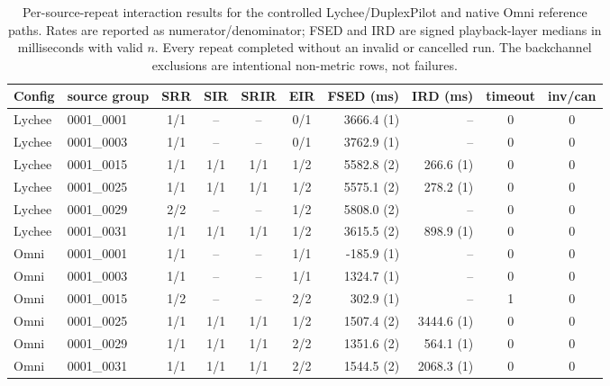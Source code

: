 \begin{table}[t]
\centering
\scriptsize
\setlength{\tabcolsep}{3pt}
\caption{Per-source-repeat interaction results for the controlled Lychee/DuplexPilot and native Omni reference paths. Rates are reported as numerator/denominator; FSED and IRD are signed playback-layer medians in milliseconds with valid $n$. Every repeat completed without an invalid or cancelled run. The backchannel exclusions are intentional non-metric rows, not failures.}
\label{tab:interaction_repeats}
\begin{tabular}{llccccrrcc}
\toprule
Config & source group & SRR & SIR & SRIR & EIR & FSED (ms) & IRD (ms) & timeout & inv/can \\
\midrule
Lychee & 0001\_0001 & 1/1 & -- & -- & 0/1 & 3666.4 (1) & -- & 0 & 0 \\
Lychee & 0001\_0003 & 1/1 & -- & -- & 0/1 & 3762.9 (1) & -- & 0 & 0 \\
Lychee & 0001\_0015 & 1/1 & 1/1 & 1/1 & 1/2 & 5582.8 (2) & 266.6 (1) & 0 & 0 \\
Lychee & 0001\_0025 & 1/1 & 1/1 & 1/1 & 1/2 & 5575.1 (2) & 278.2 (1) & 0 & 0 \\
Lychee & 0001\_0029 & 2/2 & -- & -- & 1/2 & 5808.0 (2) & -- & 0 & 0 \\
Lychee & 0001\_0031 & 1/1 & 1/1 & 1/1 & 1/2 & 3615.5 (2) & 898.9 (1) & 0 & 0 \\
\midrule
Omni & 0001\_0001 & 1/1 & -- & -- & 1/1 & -185.9 (1) & -- & 0 & 0 \\
Omni & 0001\_0003 & 1/1 & -- & -- & 1/1 & 1324.7 (1) & -- & 0 & 0 \\
Omni & 0001\_0015 & 1/2 & -- & -- & 2/2 & 302.9 (1) & -- & 1 & 0 \\
Omni & 0001\_0025 & 1/1 & 1/1 & 1/1 & 1/2 & 1507.4 (2) & 3444.6 (1) & 0 & 0 \\
Omni & 0001\_0029 & 1/1 & 1/1 & 1/1 & 2/2 & 1351.6 (2) & 564.1 (1) & 0 & 0 \\
Omni & 0001\_0031 & 1/1 & 1/1 & 1/1 & 2/2 & 1544.5 (2) & 2068.3 (1) & 0 & 0 \\
\bottomrule
\end{tabular}
\end{table}
